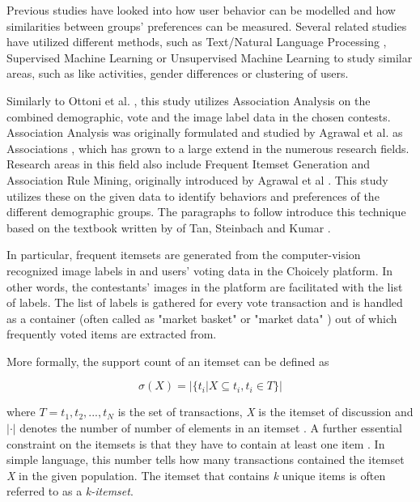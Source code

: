 Previous studies have looked into how user behavior can be modelled and how similarities between groups' preferences can be measured. Several related studies have utilized different methods, such as Text/Natural Language Processing \cite{ottoni2013ladies, farseev2015harvestingmultiplesources, jang2016teensengagemorewithfewerphotos, kabinsingha2012movie, han2016teensarefrommars}, Supervised Machine Learning \cite{chinesemobilebankingusers, saraee2004data, kabinsingha2012movie, farseev2015harvestingmultiplesources, han2016teensarefrommars, jang2015no, bakhshi2014faces} or Unsupervised Machine Learning \cite{saraee2004data, hu2014we, jang2015no} to study similar areas, such as like activities, gender differences or clustering of users. 

Similarly to Ottoni et al. \cite{ottoni2013ladies}, this study utilizes Association Analysis on the combined demographic, vote and the image label data in the chosen contests. Association Analysis was originally formulated and studied by Agrawal et al. as Associations \cite{database_mining_agrawal, mining_association_rules_agrawal}, which has grown to a large extend in the numerous research fields. Research areas in this field also include Frequent Itemset Generation and Association Rule Mining, originally introduced by Agrawal et al \cite{mining_association_rules_agrawal}. This study utilizes these on the given data to identify behaviors and preferences of the different demographic groups. The paragraphs to follow introduce this technique based on the textbook written by of Tan, Steinbach and Kumar \cite{introtodatamining}.

In particular, frequent itemsets are generated from the computer-vision recognized image labels in and users' voting data in the Choicely platform. In other words, the contestants' images in the platform are facilitated with the list of labels. The list of labels is gathered for every vote transaction and is handled as a container (often called as "market basket" or "market data" \cite{Brin97dynamicitemset, Brin1997BeyondMB, Raeder2010MarketBA}) out of which frequently voted items are extracted from. 

More formally, the support count of an itemset can be defined as

\begin{equation}
    \sigma (X) = |\{ t_i | X \subseteq t_i, t_i \in T \}|
\end{equation}

where $T = {t_1, t_2, ..., t_N}$ is the set of transactions, \emph{X} is the itemset of discussion and $| \cdot |$ denotes the number of number of elements in an itemset \cite{introtodatamining}. A further essential constraint on the itemsets is that they have to contain at least one item \cite{introtodatamining}. In simple language, this number tells how many transactions contained the itemset \emph{X} in the given population. The itemset that contains \emph{k} unique items is often referred to as a \emph{k-itemset}. 

